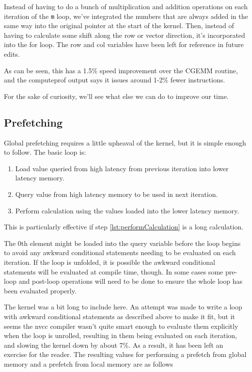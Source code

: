 \documentclass[a4paper,12pt]{report}
\begin{document}
Instead of having to do a bunch of multiplication and addition operations on each iteration of the \verb!m! loop, we've integrated the numbers that are always added in the same way into the original pointer at the start of the kernel.
Then, instead of having to calculate some shift along the row or vector direction, it's incorporated into the for loop.
The row and col variables have been left for reference in future edits.

As can be seen, this has a 1.5\%
speed improvement over the CGEMM routine, and the computeprof output says it issues around 1-2\%
fewer instructions.

For the sake of curiosity, we'll see what else we can do to improve our time.


\subsection{Prefetching}
Global prefetching requires a little upheaval of the kernel, but it is simple enough to follow.
The basic loop is\cite[p~114]{ KirkAndHwu}:

\begin{enumerate}
\item Load value queried from high latency from previous iteration into lower latency memory.

\item Query value from high latency memory to be used in next iteration.

\item\label{lst:performCalculation} Perform calculation using the values loaded into the lower latency memory.
\end{enumerate}

This is particularly effective if step \ref{lst:performCalculation} is a long calculation.

The 0th element might be loaded into the query variable before the loop begins to avoid any awkward conditional statements needing to be evaluated on each iteration.
If the loop is unfolded, it is possible the awkward conditional statements will be evaluated at compile time, though.
In some cases some pre-loop and post-loop operations will need to be done to ensure the whole loop has been evaluated properly.

The kernel was a bit long to include here.
An attempt was made to write a loop with awkward conditional statements as described above to make it fit, but it seems the nvcc compiler wasn't quite smart enough to evaluate them explicitly when the loop is unrolled, resulting in them being evaluated on each iteration, and slowing the kernel down by about 7\%.
As a result, it has been left an exercise for the reader.
The resulting values for performing a prefetch from global memory and a prefetch from local memory are as follows
\end{document}
